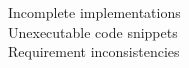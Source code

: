 \documentclass[preview]{standalone}
\begin{document}
Incomplete implementations\\Unexecutable code snippets\\Requirement inconsistencies\\
\end{document}
